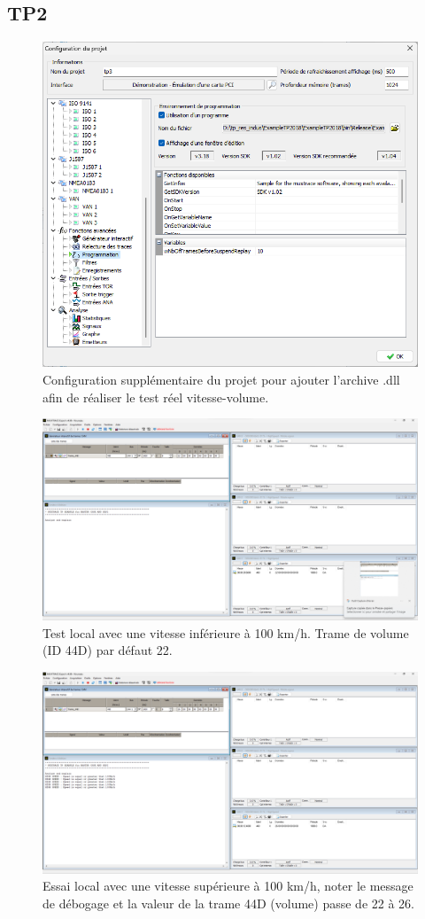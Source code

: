\documentclass{rapportECC}
\begin{document}
\subsection{TP2}

\begin{figure}[H]
    \centering
    \includegraphics[width=.7\textwidth]{./images/Muxtrace_programmation_configuration_res_indus_31_01_2024_ubs_lorient_M1SESI.png}
    \caption{Configuration supplémentaire du projet pour ajouter l'archive .dll afin de réaliser le test réel vitesse-volume.}
    \label{fig:conf_additional_real_limit_vitesse}
\end{figure}

\begin{figure}[H]
    \centering
    \includegraphics[width=.7\textwidth]{./images/test1.png}
    \caption{Test local avec une vitesse inférieure à 100 km/h. Trame de volume (ID 44D) par défaut 22.}
    \label{fig:test_local_1}
\end{figure}

\begin{figure}[H]
    \centering
    \includegraphics[width=.7\textwidth]{./images/test1_2.png}
    \caption{Essai local avec une vitesse supérieure à 100 km/h, noter le message de débogage et la valeur de la trame 44D (volume) passe de 22 à 26.}
    \label{fig:test_local_2}
\end{figure}
\end{document}
